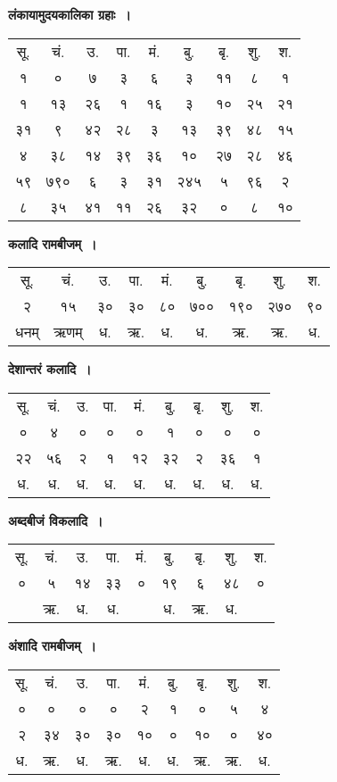 \documentclass[11pt, openany]{book}
\begin{document}
\begin{center}
{\large \textbf{लंकायामुदयकालिका ग्रहाः~।}}
\vspace{4mm}

\begin{tabular}{ccccccccc}
सू. & चं. & उ. & पा. & मं. & बु. & बृ. & शु. & श. \\
१ & ० & ७ & ३ & ६ & ३ & ११ & ८ & १\\
१ & १३ & २६ & १ & १६ & ३ & १० & २५ & २१\\
३१ & ९ & ४२ & २८ & ३ & १३ & ३९ & ४८ & १५\\
४ & ३८ & १४ & ३९ & ३६ & १० & २७ & २८ & ४६\\
५९ & ७९० & ६ & ३ & ३१ & २४५ & ५ & ९६ & २\\
८ & ३५ & ४१ & ११ & २६ & ३२ & ० & ८ & १०
\end{tabular}
\vspace{6mm}

{\large \textbf{कलादि रामबीजम्~।}}
\vspace{4mm}

\begin{tabular}{ccccccccc}
सू. & चं. & उ. & पा. & मं. & बु. & बृ. & शु. & श. \\
२ & १५ & ३० & ३० & ८० & ७०० & १९० & २७० & ९०\\
धनम् & ऋणम् & ध. & ऋ. & ध. & ध. & ऋ. & ऋ. & ध.
\end{tabular}
\vspace{6mm}

{\large \textbf{देशान्तरं कलादि~।}}
\vspace{4mm}

\begin{tabular}{ccccccccc}
सू. & चं. & उ. & पा. & मं. & बु. & बृ. & शु. & श. \\
० & ४ & ० & ० & ० & १ & ० & ० & ०\\
२२ & ५६ & २ & १ & १२ & ३२ & २ & ३६ & १\\
ध. & ध. & ध. & ध. & ध. & ध. & ध. & ध. & ध.
\end{tabular}
\vspace{6mm}

{\large \textbf{अब्दबीजं विकलादि~।}} 
\vspace{4mm}

\begin{tabular}{ccccccccc}
सू. & चं. & उ. & पा. & मं. & बु. & बृ. & शु. & श. \\
० & ५ & १४ & ३३ & ० & १९ & ६ & ४८ & ०\\
 & ऋ. & ध. & ध. & & ध. & ऋ. & ध. & 
\end{tabular}
\vspace{6mm}

{\large \textbf{अंशादि रामबीजम्~। }}
\vspace{4mm}

\begin{tabular}{ccccccccc}
सू. & चं. & उ. & पा. & मं. & बु. & बृ. & शु. & श. \\
० & ० & ० & ० & २ & १ & ० & ५ & ४\\
२ & ३४ & ३० & ३० & १० & ० & १० & ० & ४०\\
ध. & ऋ. & ध. & ऋ. & ध. & ध. & ऋ. & ऋ. & ध.
\end{tabular}
\end{center}
\end{document}
